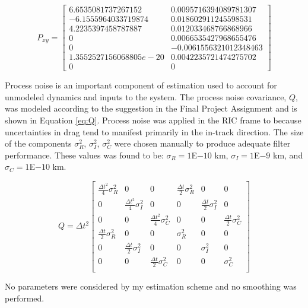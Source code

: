 \documentclass[11pt]{article}
\begin{document}
\begin{equation}
\label{eq:P_xy}
P_{xy} = \begin{bmatrix}
    6.6535081737267152 & 0.0095716394089781307 \\
   -6.1555964033719874 &  0.018602911245598531 \\
    4.2235397458787887 &  0.012033468766868966 \\
                     0 & 0.0066535427968655476 \\
                     0 & -0.0061556321012348463 \\
1.3552527156068805e-20 & 0.0042235721474275702 \\
                     0 &                     0
\end{bmatrix}
\end{equation}


Process noise is an important component of estimation used to account for unmodeled dynamics and inputs to the system. The process noise covariance, $Q$, was modeled according to the suggestion in the Final Project Assignment and is shown in Equation \eqref{eq:Q}. Process noise was applied in the RIC frame to because uncertainties in drag tend to manifest primarily in the in-track direction. The size of the components $\sigma_R^2$, $\sigma_I^2$, $\sigma_C^2$ were chosen manually to produce adequate filter performance. These values was found to be: $\sigma_R = 1$E$-10$ km, $\sigma_I = 1$E$-9$ km, and $\sigma_C = 1$E$-10$ km.

\begin{equation}
\label{eq:Q}
Q = \Delta t^2 \begin{bmatrix}
\frac{\Delta t^2}{4} \sigma_R^2 & 0 & 0 & \frac{\Delta t}{2} \sigma_R^2 & 0 & 0 \\
0 & \frac{\Delta t^2}{4} \sigma_I^2 & 0 & 0 & \frac{\Delta t}{2} \sigma_I^2 & 0 \\
0 & 0 & \frac{\Delta t^2}{4} \sigma_C^2 & 0 & 0 & \frac{\Delta t}{2} \sigma_C^2 \\
\frac{\Delta t}{2} \sigma_R^2 & 0 & 0 & \sigma_R^2 & 0 & 0 \\
0 & \frac{\Delta t}{2} \sigma_I^2 & 0 & 0 & \sigma_I^2 & 0 \\
0 & 0 & \frac{\Delta t}{2} \sigma_C^2 & 0 & 0 & \sigma_C^2 \\	
\end{bmatrix}
\end{equation}

No parameters were considered by my estimation scheme and no smoothing was performed.
\end{document}
